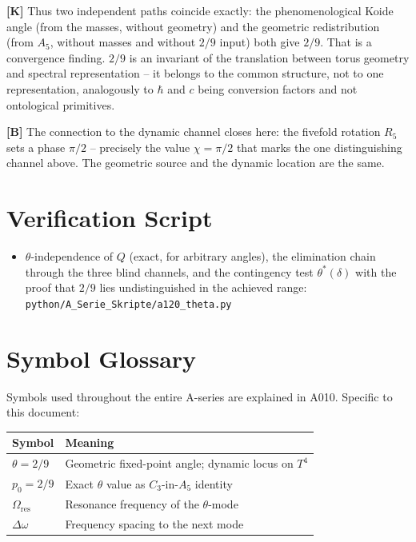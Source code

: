 \textbf{[K]} Thus two independent paths coincide exactly: the phenomenological
Koide angle (from the masses, without geometry) and the geometric redistribution
(from $A_5$, without masses and without $2/9$ input) both give $2/9$. That is a
convergence finding. $2/9$ is an invariant of the translation between torus
geometry and spectral representation -- it belongs to the common structure, not to
one representation, analogously to $\hbar$ and $c$ being conversion factors and
not ontological primitives.

\textbf{[B]} The connection to the dynamic channel closes here: the fivefold
rotation $R_5$ sets a phase $\pi/2$ -- precisely the value $\chi = \pi/2$ that
marks the one distinguishing channel above. The geometric source and the dynamic
location are the same.

\section{Verification Script}

\begin{itemize}
  \item $\theta$-independence of $Q$ (exact, for arbitrary angles), the
    elimination chain through the three blind channels, and the contingency test
    $\theta^*(\delta)$ with the proof that $2/9$ lies undistinguished in the
    achieved range:
    \texttt{python/A\_Serie\_Skripte/a120\_theta.py}
\end{itemize}

\section{Symbol Glossary}

Symbols used throughout the entire A-series are explained in A010.
Specific to this document:

\begin{center}
\renewcommand{\arraystretch}{1.3}
{\small\begin{tabular}{lp{9cm}}
\toprule
Symbol & Meaning \\
\midrule
$\theta = 2/9$ & Geometric fixed-point angle; dynamic locus on $T^4$ \\
$p_0 = 2/9$ & Exact $\theta$ value as $C_3$-in-$A_5$ identity \\
$\Omega_\text{res}$ & Resonance frequency of the $\theta$-mode \\
$\Delta\omega$ & Frequency spacing to the next mode \\
\bottomrule
\end{tabular}}
\renewcommand{\arraystretch}{1.0}
\end{center}


